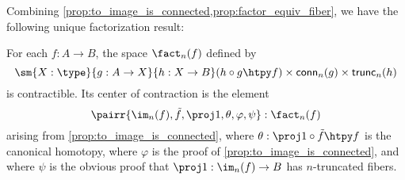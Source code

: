 
Combining \cref{prop:to_image_is_connected,prop:factor_equiv_fiber}, we have the following unique factorization result:

\begin{thm}\label{thm:orth-fact}
For each $f:A\to B$, the space $\fact_n(f)$ defined by
\begin{equation*}
\sm{X:\type}{g:A\to X}{h:X\to B} (h\circ g\htpy f)\times\mathsf{conn}_n(g)\times\mathsf{trunc}_n(h)
\end{equation*}
is contractible.
Its center of contraction is the element
\begin{equation*}
\pairr{\im_n(f),\tilde{f},\proj1,\theta,\varphi,\psi}:\fact_n(f)
\end{equation*}
arising from \cref{prop:to_image_is_connected},
where $\theta:\proj1\circ\tilde{f}\htpy f$ is the canonical homotopy, where $\varphi$ is the proof of
\cref{prop:to_image_is_connected}, and where $\psi$ is the obvious proof that $\proj1:\im_n(f)\to B$ has $n$-truncated fibers.
\end{thm}


